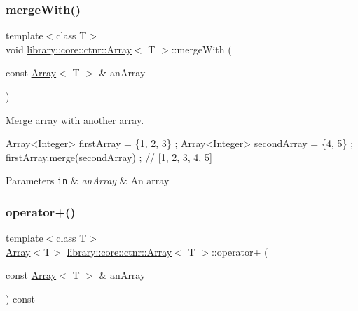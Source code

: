 \subsubsection{\texorpdfstring{merge\+With()}{mergeWith()}}
{\footnotesize\ttfamily template$<$class T$>$ \\
void \hyperlink{classlibrary_1_1core_1_1ctnr_1_1_array}{library\+::core\+::ctnr\+::\+Array}$<$ T $>$\+::merge\+With (\begin{DoxyParamCaption}\item[{const \hyperlink{classlibrary_1_1core_1_1ctnr_1_1_array}{Array}$<$ T $>$ \&}]{an\+Array }\end{DoxyParamCaption})}



Merge array with another array. 


\begin{DoxyCode}
Array<Integer> firstArray = \{1, 2, 3\} ;
Array<Integer> secondArray = \{4, 5\} ;
firstArray.merge(secondArray) ; \textcolor{comment}{// [1, 2, 3, 4, 5]}
\end{DoxyCode}



\begin{DoxyParams}[1]{Parameters}
\mbox{\tt in}  & {\em an\+Array} & An array \\
\hline
\end{DoxyParams}
\mbox{\label{classlibrary_1_1core_1_1ctnr_1_1_array_a5d65732e2a07b268d9def2da3c955002}} 
\subsubsection{\texorpdfstring{operator+()}{operator+()}}
{\footnotesize\ttfamily template$<$class T$>$ \\
\hyperlink{classlibrary_1_1core_1_1ctnr_1_1_array}{Array}$<$T$>$ \hyperlink{classlibrary_1_1core_1_1ctnr_1_1_array}{library\+::core\+::ctnr\+::\+Array}$<$ T $>$\+::operator+ (\begin{DoxyParamCaption}\item[{const \hyperlink{classlibrary_1_1core_1_1ctnr_1_1_array}{Array}$<$ T $>$ \&}]{an\+Array }\end{DoxyParamCaption}) const}



